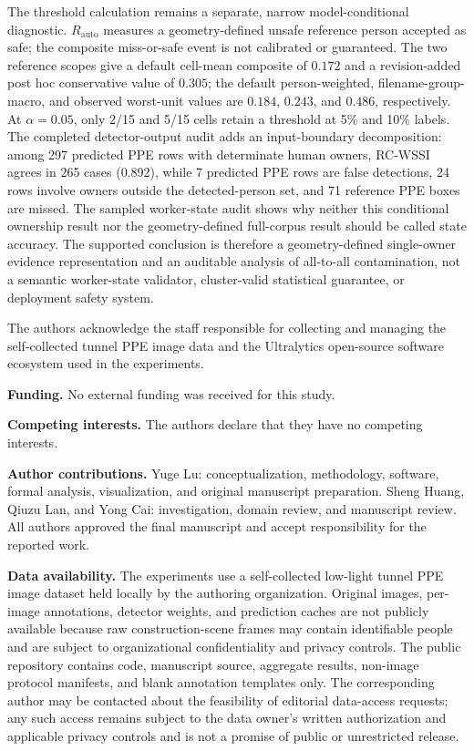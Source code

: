 \documentclass[iicol,pdflatex,sn-mathphys-num]{sn-jnl}
\begin{document}
 The threshold calculation remains a separate, narrow model-conditional diagnostic. $R_{\mathrm{auto}}$ measures a geometry-defined unsafe reference person accepted as safe; the composite miss-or-safe event is not calibrated or guaranteed. The two reference scopes give a default cell-mean composite of $0.172$ and a revision-added post hoc conservative value of $0.305$; the default person-weighted, filename-group-macro, and observed worst-unit values are $0.184$, $0.243$, and $0.486$, respectively. At $\alpha=0.05$, only 2/15 and 5/15 cells retain a threshold at 5\% and 10\% labels. The completed detector-output audit adds an input-boundary decomposition: among 297 predicted PPE rows with determinate human owners, RC-WSSI agrees in 265 cases (0.892), while 7 predicted PPE rows are false detections, 24 rows involve owners outside the detected-person set, and 71 reference PPE boxes are missed. The sampled worker-state audit shows why neither this conditional ownership result nor the geometry-defined full-corpus result should be called state accuracy. The supported conclusion is therefore a geometry-defined single-owner evidence representation and an auditable analysis of all-to-all contamination, not a semantic worker-state validator, cluster-valid statistical guarantee, or deployment safety system.

\backmatter

The authors acknowledge the staff responsible for collecting and managing the self-collected tunnel PPE image data and the Ultralytics open-source software ecosystem used in the experiments.


\textbf{Funding.} No external funding was received for this study.

\textbf{Competing interests.} The authors declare that they have no competing interests.

\textbf{Author contributions.} Yuge Lu: conceptualization, methodology, software, formal analysis, visualization, and original manuscript preparation. Sheng Huang, Qiuzu Lan, and Yong Cai: investigation, domain review, and manuscript review. All authors approved the final manuscript and accept responsibility for the reported work.

\textbf{Data availability.} The experiments use a self-collected low-light tunnel PPE image dataset held locally by the authoring organization. Original images, per-image annotations, detector weights, and prediction caches are not publicly available because raw construction-scene frames may contain identifiable people and are subject to organizational confidentiality and privacy controls. The public repository contains code, manuscript source, aggregate results, non-image protocol manifests, and blank annotation templates only. The corresponding author may be contacted about the feasibility of editorial data-access requests; any such access remains subject to the data owner's written authorization and applicable privacy controls and is not a promise of public or unrestricted release.
\end{document}
